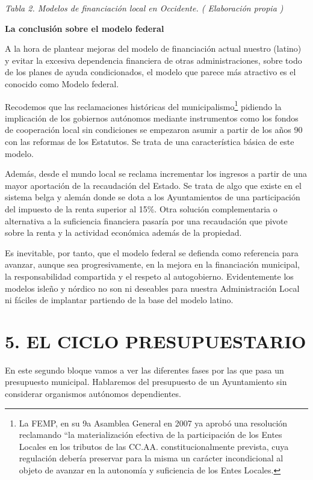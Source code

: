 \documentclass[
]{article}
\begin{document}
\emph{Tabla 2. Modelos de financiación local en Occidente. ( Elaboración
propia )}

\textbf{La conclusión sobre el modelo federal}

A la hora de plantear mejoras del modelo de financiación actual nuestro
(latino) y evitar la excesiva dependencia financiera de otras
administraciones, sobre todo de los planes de ayuda condicionados, el
modelo que parece más atractivo es el conocido como Modelo federal.

Recodemos que las reclamaciones históricas del municipalismo\footnote{La
  FEMP, en su 9a Asamblea General en 2007 ya aprobó una resolución
  reclamando ``la materialización efectiva de la participación de los
  Entes Locales en los tributos de las CC.AA. constitucionalmente
  prevista, cuya regulación debería preservar para la misma un carácter
  incondicional al objeto de avanzar en la autonomía y suficiencia de
  los Entes Locales.} pidiendo la implicación de los gobiernos autónomos
mediante instrumentos como los fondos de cooperación local sin
condiciones se empezaron asumir a partir de los años 90 con las reformas
de los Estatutos. Se trata de una característica básica de este modelo.

Además, desde el mundo local se reclama incrementar los ingresos a
partir de una mayor aportación de la recaudación del Estado. Se trata de
algo que existe en el sistema belga y alemán donde se dota a los
Ayuntamientos de una participación del impuesto de la renta superior al
15\%. Otra solución complementaria o alternativa a la suficiencia
financiera pasaría por una recaudación que pivote sobre la renta y la
actividad económica además de la propiedad.

Es inevitable, por tanto, que el modelo federal se defienda como
referencia para avanzar, aunque sea progresivamente, en la mejora en la
financiación municipal, la responsabilidad compartida y el respeto al
autogobierno. Evidentemente los modelos isleño y nórdico no son ni
deseables para nuestra Administración Local ni fáciles de implantar
partiendo de la base del modelo latino.

\hypertarget{el-ciclo-presupuestario}{%
\section{5. EL CICLO PRESUPUESTARIO}\label{el-ciclo-presupuestario}}

En este segundo bloque vamos a ver las diferentes fases por las que pasa
un presupuesto municipal. Hablaremos del presupuesto de un Ayuntamiento
sin considerar organismos autónomos dependientes.
\end{document}
